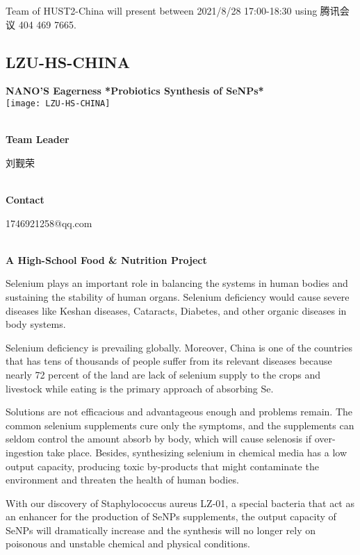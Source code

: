 Team of HUST2-China will present between        2021/8/28 17:00-18:30 using 腾讯会议 404 469 7665.
\newpage


\subsection{\textcolor{Blu}{ LZU-HS-CHINA } }
\vspace{5mm}
\begin{center}
\large{
  \textbf{ NANO'S Eagerness *Probiotics Synthesis of SeNPs* }\\
  \texttt{[image: LZU-HS-CHINA]}
}
\end{center}
\textbf{\\Team Leader}

  刘觐荣


\textbf{\\Contact}

  1746921258@qq.com


\textbf{\\A High-School Food & Nutrition Project\\}\begin{spacing}{1.5}

Selenium plays an important role in balancing the systems in human bodies and sustaining the stability of human organs. Selenium deficiency would cause severe diseases like Keshan diseases, Cataracts, Diabetes, and other organic diseases in body systems.

Selenium deficiency is prevailing globally. Moreover, China is one of the countries that has tens of thousands of people suffer from its relevant diseases because nearly 72 percent of the land are lack of selenium supply to the crops and livestock while eating is the primary approach of absorbing Se.

Solutions are not efficacious and advantageous enough and problems remain. The common selenium supplements cure only the symptoms, and the supplements can seldom control the amount absorb by body, which will cause selenosis if over-ingestion take place. Besides, synthesizing selenium in chemical media has a low output capacity, producing toxic by-products that might contaminate the environment and threaten the health of human bodies.

With our discovery of Staphylococcus aureus LZ-01, a special bacteria that act as an enhancer for the production of SeNPs supplements, the output capacity of SeNPs will dramatically increase and the synthesis will no longer rely on poisonous and unstable chemical and physical conditions.\end{spacing}
\\

